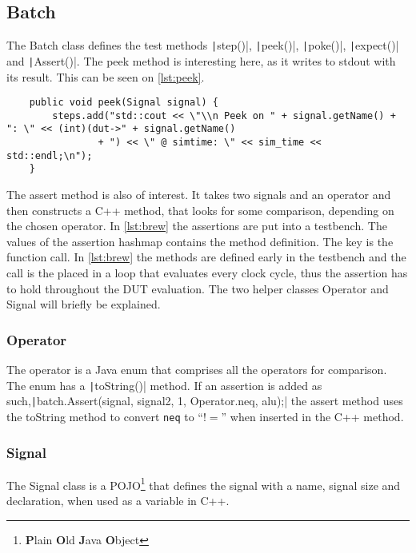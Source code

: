 \subsection{Batch}
The Batch class defines the test methods \texttt|step()|, \texttt|peek()|, \texttt|poke()|, \texttt|expect()| and \texttt|Assert()|. The peek method is interesting here, as it writes to stdout with its result. This can be seen on \cref{lst:peek}.
\begin{listing}
    \centering
    \caption{The peek method}\label{lst:peek}
    \begin{verbatim}
    public void peek(Signal signal) {
        steps.add("std::cout << \"\\n Peek on " + signal.getName() + ": \" << (int)(dut->" + signal.getName()
                + ") << \" @ simtime: \" << sim_time << std::endl;\n");
    }
    \end{verbatim}
\end{listing}
The assert method is also of interest. It takes two signals and an operator and then constructs a C++ method, that looks for some comparison, depending on the chosen operator. In \cref{lst:brew} the assertions are put into a testbench. The values of the assertion hashmap contains the method definition. The key is the function call. In \cref{lst:brew} the methods are defined early in the testbench and the call is the placed in a loop that evaluates every clock cycle, thus the assertion has to hold throughout the DUT evaluation. The two helper classes Operator and Signal will briefly be explained.
\subsubsection{Operator}
The operator is a Java enum that comprises all the operators for comparison. The enum has a \texttt|toString()| method. If an assertion is added as such,\newline\texttt|batch.Assert(signal, signal2, 1, Operator.neq, alu);| the assert method uses the toString method to convert \texttt{neq} to ``\(!=\)'' when inserted in the C++ method.
\subsubsection{Signal}
The Signal class is a POJO\footnote{\textbf{P}lain \textbf{O}ld \textbf{J}ava \textbf{O}bject} that defines the signal with a name, signal size and declaration, when used as a variable in C++.
